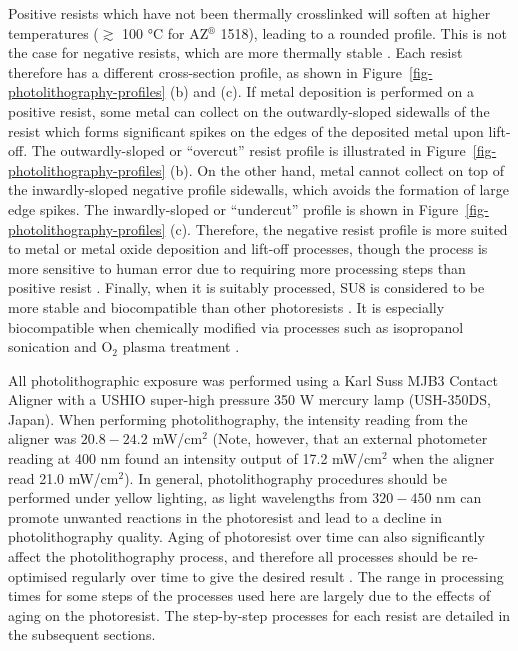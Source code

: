 \documentclass[
  a4paper,
]{scrbook}
\begin{document}
Positive resists which have not been thermally crosslinked will soften
at higher temperatures (\(\gtrsim\) 100 °C for AZ\(^\circledR\) 1518),
leading to a rounded profile. This is not the case for negative resists,
which are more thermally stable \autocite{Microchemicals1}. Each resist
therefore has a different cross-section profile, as shown in
Figure~\ref{fig-photolithography-profiles} (b) and (c). If metal
deposition is performed on a positive resist, some metal can collect on
the outwardly-sloped sidewalls of the resist which forms significant
spikes on the edges of the deposited metal upon lift-off. The
outwardly-sloped or ``overcut'' resist profile is illustrated in
Figure~\ref{fig-photolithography-profiles} (b). On the other hand, metal
cannot collect on top of the inwardly-sloped negative profile sidewalls,
which avoids the formation of large edge spikes. The inwardly-sloped or
``undercut'' profile is shown in
Figure~\ref{fig-photolithography-profiles} (c). Therefore, the negative
resist profile is more suited to metal or metal oxide deposition and
lift-off processes, though the process is more sensitive to human error
due to requiring more processing steps than positive resist
\autocite{Microchemicals1}. Finally, when it is suitably processed, SU8
is considered to be more stable and biocompatible than other
photoresists \autocite{Albarghouthi2022}. It is especially biocompatible
when chemically modified via processes such as isopropanol sonication
and O\(_2\) plasma treatment \autocite{Chen2021}.

All photolithographic exposure was performed using a Karl Suss MJB3
Contact Aligner with a USHIO super-high pressure 350 W mercury lamp
(USH-350DS, Japan). When performing photolithography, the intensity
reading from the aligner was \(20.8-24.2\) mW/cm\(^2\) (Note, however,
that an external photometer reading at 400 nm found an intensity output
of 17.2 mW/cm\(^2\) when the aligner read 21.0 mW/cm\(^2\)). In general,
photolithography procedures should be performed under yellow lighting,
as light wavelengths from \(320-450\) nm can promote unwanted reactions
in the photoresist and lead to a decline in photolithography quality.
Aging of photoresist over time can also significantly affect the
photolithography process, and therefore all processes should be
re-optimised regularly over time to give the desired result
\autocite{Microchemicals1}. The range in processing times for some steps
of the processes used here are largely due to the effects of aging on
the photoresist. The step-by-step processes for each resist are detailed
in the subsequent sections.
\end{document}
